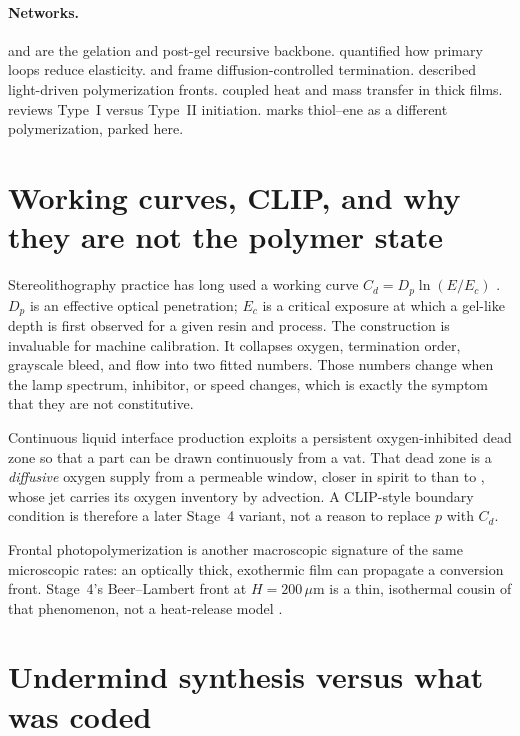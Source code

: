 \paragraph{Networks.}
\citet{Flory1941} and \citet{Macosko1976,Miller1976} are the gelation and post-gel recursive backbone.
\citet{Zhong2016} quantified how primary loops reduce elasticity.
\citet{Anseth1994} and \citet{Benson1959} frame diffusion-controlled termination.
\citet{Cabral2005} described light-driven polymerization fronts.
\citet{Goodner2002} coupled heat and mass transfer in thick films.
\citet{Dadashi2016} reviews Type~I versus Type~II initiation.
\citet{Cramer2001} marks thiol--ene as a different polymerization, parked here.

\section{Working curves, CLIP, and why they are not the polymer state}

Stereolithography practice has long used a working curve $C_d=D_p\ln(E/E_c)$ \citep{Jacobs1992book}.
$D_p$ is an effective optical penetration; $E_c$ is a critical exposure at which a gel-like depth is first observed for a given resin and process.
The construction is invaluable for machine calibration.
It collapses oxygen, termination order, grayscale bleed, and flow into two fitted numbers.
Those numbers change when the lamp spectrum, inhibitor, or speed changes, which is exactly the symptom that they are not constitutive.

Continuous liquid interface production \citep{Tumbleston2015} exploits a persistent oxygen-inhibited dead zone so that a part can be drawn continuously from a vat.
That dead zone is a \emph{diffusive} oxygen supply from a permeable window, closer in spirit to \citet{Dendukuri2008} than to \citet{Slutzky2019}, whose jet carries its oxygen inventory by advection.
A CLIP-style boundary condition is therefore a later Stage~4 variant, not a reason to replace $p$ with $C_d$.

Frontal photopolymerization \citep{Cabral2005} is another macroscopic signature of the same microscopic rates: an optically thick, exothermic film can propagate a conversion front.
Stage~4's Beer--Lambert front at $H=200\,\mu\mathrm{m}$ is a thin, isothermal cousin of that phenomenon, not a heat-release model \citep{Goodner2002}.

\section{Undermind synthesis versus what was coded}

